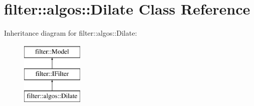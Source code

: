 \hypertarget{classfilter_1_1algos_1_1_dilate}{}\section{filter\+:\+:algos\+:\+:Dilate Class Reference}
\label{classfilter_1_1algos_1_1_dilate}
Inheritance diagram for filter\+:\+:algos\+:\+:Dilate\+:\begin{figure}[H]
\begin{center}
\leavevmode
\includegraphics[height=3.000000cm]{de/de2/classfilter_1_1algos_1_1_dilate}
\end{center}
\end{figure}
